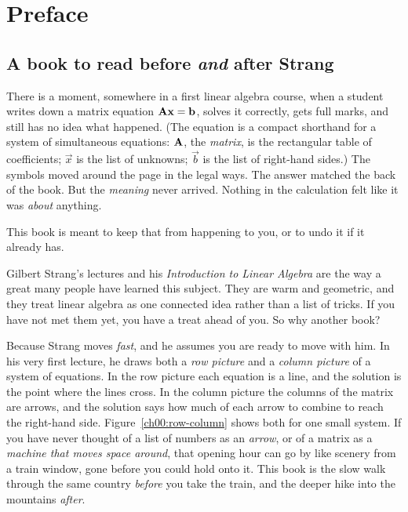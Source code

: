 \chapter*{Preface}

\section*{A book to read before \emph{and} after Strang}

There is a moment, somewhere in a first linear algebra course, when a student
writes down a matrix equation $\mathbf{A}\mathbf{x} = \mathbf{b}$, solves it correctly,
gets full marks, and still has no idea what happened. (The equation is a compact
shorthand for a system of simultaneous equations: $\mathbf{A}$, the \emph{matrix}, is
the rectangular table of coefficients; $\vec{x}$ is the list of unknowns; $\vec{b}$
is the list of right-hand sides.) The symbols moved around the page in the legal
ways. The answer matched the back of the book. But the \emph{meaning} never
arrived. Nothing in the calculation felt like it was \emph{about} anything.

This book is meant to keep that from happening to you, or to undo it if it
already has.

Gilbert Strang's lectures and his \emph{Introduction to Linear Algebra} are the way
a great many people have learned this subject. They are warm and geometric, and
they treat linear algebra as one connected idea rather than a list of tricks. If
you have not met them yet, you have a treat ahead of you. So why another book?

Because Strang moves \emph{fast}, and he assumes you are ready to move with him.
In his very first lecture, he draws both a \emph{row picture} and a \emph{column
picture} of a system of equations. In the row picture each equation is a line,
and the solution is the point where the lines cross. In the column picture the
columns of the matrix are arrows, and the solution says how much of each arrow to
combine to reach the right-hand side. Figure~\ref{ch00:row-column} shows both for one
small system. If you have never thought of a list of numbers as an
\emph{arrow}, or of a matrix as a \emph{machine that moves space around}, that
opening hour can go by like scenery from a train window, gone before
you could hold onto it. This book is the slow walk through the same country \emph{before}
you take the train, and the deeper hike into the mountains \emph{after}.

